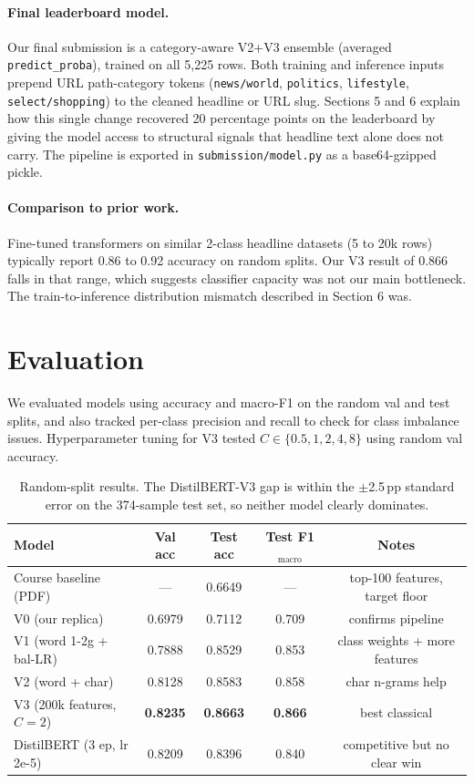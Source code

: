\documentclass[11pt]{article}
\begin{document}
\paragraph{Final leaderboard model.}
Our final submission is a category-aware V2+V3 ensemble (averaged \texttt{predict\_proba}), trained on all 5,225 rows. Both training and inference inputs prepend URL path-category tokens (\texttt{news/world}, \texttt{politics}, \texttt{lifestyle}, \texttt{select/shopping}) to the cleaned headline or URL slug. Sections 5 and 6 explain how this single change recovered 20 percentage points on the leaderboard by giving the model access to structural signals that headline text alone does not carry. The pipeline is exported in \texttt{submission/model.py} as a base64-gzipped pickle.

\paragraph{Comparison to prior work.}
Fine-tuned transformers on similar 2-class headline datasets (5 to 20k rows) typically report 0.86 to 0.92 accuracy on random splits. Our V3 result of 0.866 falls in that range, which suggests classifier capacity was not our main bottleneck. The train-to-inference distribution mismatch described in Section 6 was.

\section{Evaluation}
We evaluated models using accuracy and macro-F1 on the random val and test splits, and also tracked per-class precision and recall to check for class imbalance issues. Hyperparameter tuning for V3 tested $C \in \{0.5, 1, 2, 4, 8\}$ using random val accuracy.

\begin{table}[h]
\centering\small
\begin{tabular}{lcccc}
\toprule
Model & Val acc & Test acc & Test F1$_{\text{macro}}$ & Notes \\\midrule
Course baseline (PDF) & --- & 0.6649 & --- & top-100 features, target floor \\
V0 (our replica) & 0.6979 & 0.7112 & 0.709 & confirms pipeline \\
V1 (word 1-2g + bal-LR) & 0.7888 & 0.8529 & 0.853 & class weights + more features \\
V2 (word + char) & 0.8128 & 0.8583 & 0.858 & char n-grams help \\
V3 (200k features, $C{=}2$) & \textbf{0.8235} & \textbf{0.8663} & \textbf{0.866} & best classical \\
DistilBERT (3 ep, lr 2e-5) & 0.8209 & 0.8396 & 0.840 & competitive but no clear win \\
\bottomrule
\end{tabular}
\caption{Random-split results. The DistilBERT-V3 gap is within the $\pm$2.5\,pp standard error on the 374-sample test set, so neither model clearly dominates.}
\end{table}
\end{document}
